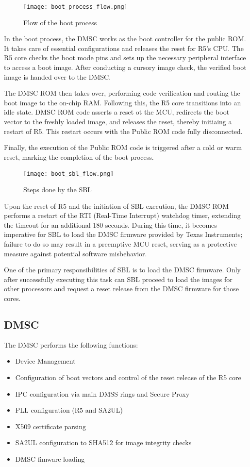 \begin{figure}[H]
    \centering
    \texttt{[image: boot\_process\_flow.png]}
    \caption{Flow of the boot process}
\end{figure}

In the boot process, the DMSC works as the boot controller for the public ROM.
It takes care of essential configurations and releases the reset for R5's CPU.
The R5 core checks the boot mode pins and sets up the necessary peripheral
interface to access a boot image. After conducting a cursory image check, the
verified boot image is handed over to the DMSC.

The DMSC ROM then takes over, performing code verification and routing the boot
image to the on-chip RAM. Following this, the R5 core transitions into an idle
state. DMSC ROM code asserts a reset ot the MCU, redirects the boot vector to
the freshly loaded image, and releases the reset, thereby initiaing a restart
of R5. This restart occurs with the Public ROM code fully disconnected.

Finally, the execution of the Public ROM code is triggered after a cold or warm
reset, marking the completion of the boot process.

\begin{figure}[H]
    \centering
    \texttt{[image: boot\_sbl\_flow.png]}
    \caption{Steps done by the SBL}
\end{figure}

Upon the reset of R5 and the initiation of SBL execution, the DMSC ROM performs
a restart of the RTI (Real-Time Interrupt) watchdog timer, extending the
timeout for an additional 180 seconds.
During this time, it becomes imperative for SBL to load the DMSC firmware
provided by Texas Instruments; failure to do so may result in a preemptive MCU
reset, serving as a protective measure against potential software misbehavior.

One of the primary responsibilities of SBL is to load the DMSC firmware.
Only after successfully executing this task can SBL proceed to load the images
for other processors and request a reset release from the DMSC firmware for
those cores.

\subsection{DMSC}

The DMSC performs the following functions:

\begin{itemize}
    \item   Device Management
    \item   Configuration of boot vectors and control of the reset release
            of the R5 core
    \item   IPC configuration via main DMSS rings and Secure Proxy
    \item   PLL configuration (R5 and SA2UL)
    \item   X509 certificate parsing
    \item   SA2UL configuration to SHA512 for image integrity checks
    \item   DMSC fimware loading
\end{itemize}

